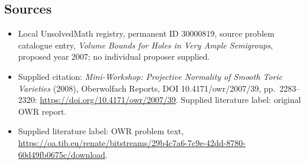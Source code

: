 \documentclass[11pt]{article}
\begin{document}
\subsection{Sources}
\begin{itemize}\item Local UnsolvedMath registry, permanent ID 30000819, source problem catalogue entry, \emph{Volume Bounds for Holes in Very Ample Semigroups}, proposed year 2007; no individual proposer supplied.\item Supplied citation: \emph{Mini-Workshop: Projective Normality of Smooth Toric Varieties} (2008), Oberwolfach Reports, DOI 10.4171/owr/2007/39, pp.\ 2283--2320: \url{https://doi.org/10.4171/owr/2007/39}. Supplied literature label: original OWR report.\item Supplied literature label: OWR problem text, \url{https://oa.tib.eu/renate/bitstreams/29b4c7a6-7c9e-42dd-8780-60d49fb0675c/download}.\end{itemize}
\end{document}
